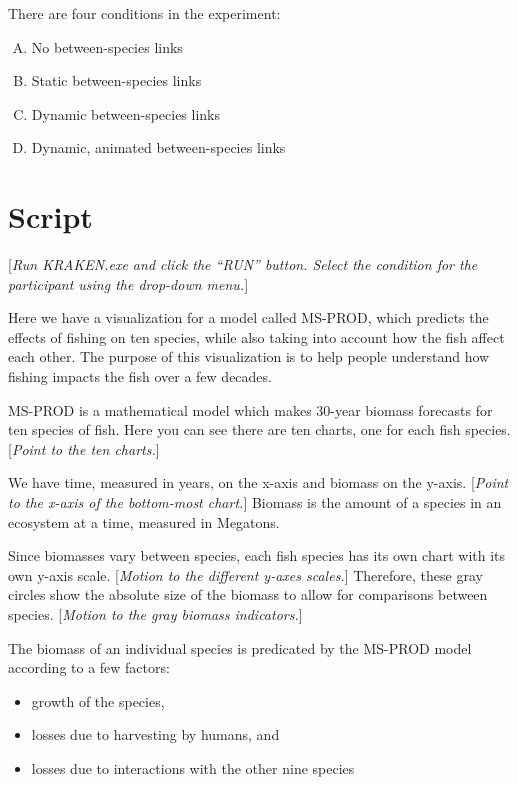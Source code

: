 {{{There are four conditions in the experiment:

\begin{enumerate}[(A)]
\item No between-species links
\item Static between-species links
\item Dynamic between-species links
\item Dynamic, animated between-species links
\end{enumerate}

\section{Script}

[\textit{Run KRAKEN.exe and click the ``RUN'' button. Select the condition for the participant using the drop-down menu.}]

Here we have a visualization for a model called MS-PROD, which predicts the effects of fishing on ten species, while also taking into account how the fish affect each other.  The purpose of this visualization is to help people understand how fishing impacts the fish over a few decades.

MS-PROD is a mathematical model which makes 30-year biomass forecasts for ten species of fish.  Here you can see there are ten charts, one for each fish species.  [\textit{Point to the ten charts.}]

We have time, measured in years, on the x-axis and biomass on the y-axis.  [\textit{Point to the x-axis of the bottom-most chart.}]  Biomass is the amount of a species in an ecosystem at a time, measured in Megatons.

Since biomasses vary between species, each fish species has its own chart with its own y-axis scale.  [\textit{Motion to the different y-axes scales.}]  Therefore, these gray circles show the absolute size of the biomass to allow for comparisons between species.  [\textit{Motion to the gray biomass indicators.}]

The biomass of an individual species is predicated by the MS-PROD model according to a few factors:

\begin{itemize}
\item growth of the species,
\item losses due to harvesting by humans, and
\item losses due to interactions with the other nine species
\end{itemize}

}}}
